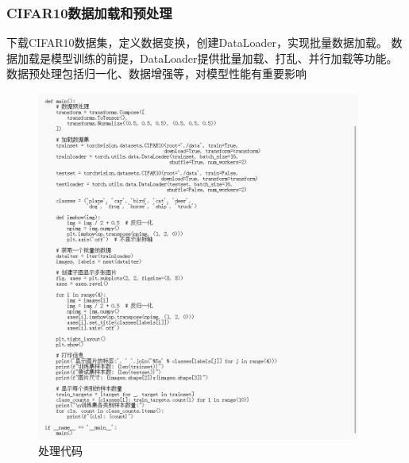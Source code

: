 \documentclass[UTF8]{ctexart}
\begin{document}
\subsubsection{CIFAR10数据加载和预处理}
下载CIFAR10数据集，定义数据变换，创建DataLoader，实现批量数据加载。
数据加载是模型训练的前提，DataLoader提供批量加载、打乱、并行加载等功能。数据预处理包括归一化、数据增强等，对模型性能有重要影响
\begin{figure}[H]
    \centering
    \includegraphics[width=0.95\textwidth]{picture/CIFAR10数据加载和预处理.png}%
    \caption{处理代码}
\end{figure}
\end{document}
